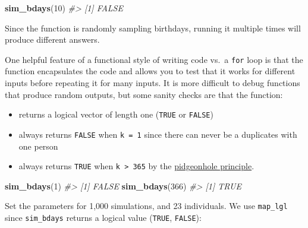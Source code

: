 \documentclass[]{book}
\newenvironment{Shaded}{\begin{snugshade}}{\end{snugshade}}
\newcommand{\KeywordTok}[1]{\textcolor[rgb]{0.13,0.29,0.53}{\textbf{#1}}}
\newcommand{\DecValTok}[1]{\textcolor[rgb]{0.00,0.00,0.81}{#1}}
\newcommand{\StringTok}[1]{\textcolor[rgb]{0.31,0.60,0.02}{#1}}
\newcommand{\CommentTok}[1]{\textcolor[rgb]{0.56,0.35,0.01}{\textit{#1}}}
\newcommand{\OperatorTok}[1]{\textcolor[rgb]{0.81,0.36,0.00}{\textbf{#1}}}
\newcommand{\NormalTok}[1]{#1}
\providecommand{\tightlist}{%
  \setlength{\itemsep}{0pt}\setlength{\parskip}{0pt}}
\theoremstyle{definition}
\theoremstyle{definition}
\theoremstyle{definition}
\theoremstyle{remark}
\begin{document}
\begin{Shaded}
\begin{Highlighting}[]
\KeywordTok{sim_bdays}\NormalTok{(}\DecValTok{10}\NormalTok{)}
\CommentTok{#> [1] FALSE}
\end{Highlighting}
\end{Shaded}

Since the function is randomly sampling birthdays, running it multiple
times will produce different answers.

One helpful feature of a functional style of writing code vs.~a
\texttt{for} loop is that the function encapsulates the code and allows
you to test that it works for different inputs before repeating it for
many inputs. It is more difficult to debug functions that produce random
outputs, but some sanity checks are that the function:

\begin{itemize}
\tightlist
\item
  returns a logical vector of length one (\texttt{TRUE} or
  \texttt{FALSE})
\item
  always returns \texttt{FALSE} when \texttt{k\ =\ 1} since there can
  never be a duplicates with one person
\item
  always returns \texttt{TRUE} when \texttt{k\ \textgreater{}\ 365} by
  the
  \href{https://en.wikipedia.org/wiki/Pigeonhole_principle}{pidgeonhole
  principle}.
\end{itemize}

\begin{Shaded}
\begin{Highlighting}[]
\KeywordTok{sim_bdays}\NormalTok{(}\DecValTok{1}\NormalTok{)}
\CommentTok{#> [1] FALSE}
\KeywordTok{sim_bdays}\NormalTok{(}\DecValTok{366}\NormalTok{)}
\CommentTok{#> [1] TRUE}
\end{Highlighting}
\end{Shaded}

Set the parameters for 1,000 simulations, and 23 individuals. We use
\texttt{map\_lgl} since \texttt{sim\_bdays} returns a logical value
(\texttt{TRUE}, \texttt{FALSE}):

\begin{Shaded}
\end{Shaded}
\end{document}
